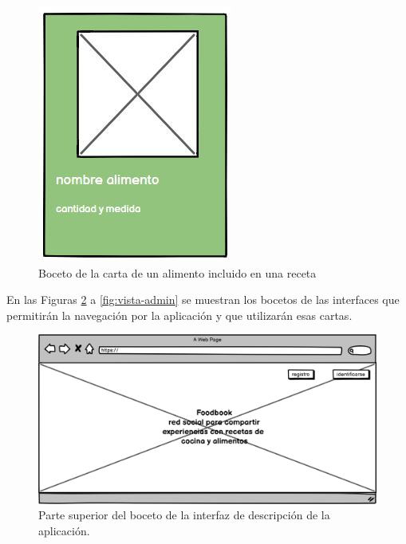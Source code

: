 \begin{figure}[H]
    \centering
    \includegraphics{img/carta-alimento-receta.jpg}
    \caption{Boceto de la carta de un alimento incluido en una receta}
    \label{fig:carta-alimento-receta}
\end{figure}






En las Figuras \ref{fig:descripcion-aplicacionPrimera} a \ref{fig:vista-admin} se muestran los bocetos de las interfaces que permitirán la navegación por la aplicación y que utilizarán esas cartas. 



\begin{figure}[H]
    \centering
    \includegraphics[scale=0.20]{img/descripcion-aplicacion1.jpg}
    \caption{Parte superior del boceto de la interfaz de descripción de la aplicación.}
    \label{fig:descripcion-aplicacionPrimera}
\end{figure}


